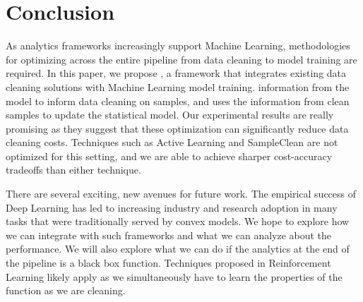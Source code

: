 \vspace{-1.0em}
\section{Conclusion}
As analytics frameworks increasingly support Machine Learning, methodologies for optimizing across the entire pipeline from data cleaning to model training are required.
In this paper, we propose \sysfull, a framework that integrates existing data cleaning solutions with Machine Learning model training.
\sys information from the model to inform data cleaning on samples, and uses the information from clean samples to update the statistical model.
Our experimental results are really promising as they suggest that these optimization can significantly reduce data cleaning costs.
Techniques such as Active Learning and SampleClean are not optimized for this setting, and we are able to achieve sharper cost-accuracy tradeoffs than either technique.
 
There are several exciting, new avenues for future work.
The empirical success of Deep Learning has led to increasing industry and research adoption in many tasks that were traditionally served by convex models.
We hope to explore how we can integrate with such frameworks and what we can analyze about the performance.
We will also explore what we can do if the analytics at the end of the pipeline is a black box function.
Techniques proposed in Reinforcement Learning likely apply as we simultaneously have to learn the properties of the function as we are cleaning.